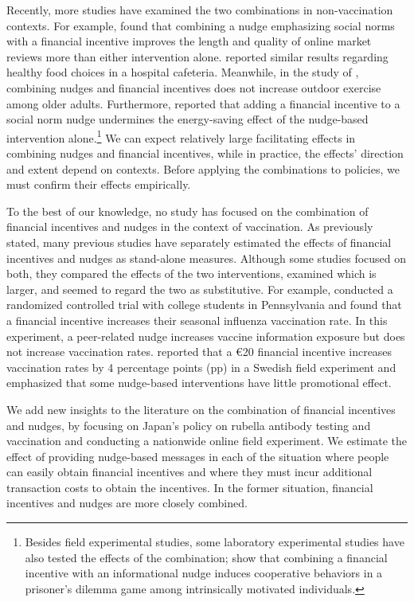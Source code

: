\documentclass[
]{article}
\begin{document}
Recently, more studies have examined the two combinations in non-vaccination contexts. For example, \citet{Burtch2018} found that combining a nudge emphasizing social norms with a financial incentive improves the length and quality of online market reviews more than either intervention alone. \citet{Thorndike2016} reported similar results regarding healthy food choices in a hospital cafeteria. Meanwhile, in the study of \citet{Kullgren2014}, combining nudges and financial incentives does not increase outdoor exercise among older adults. Furthermore, \citet{Pellerano2017} reported that adding a financial incentive to a social norm nudge undermines the energy-saving effect of the nudge-based intervention alone.\footnote{Besides field experimental studies, some laboratory experimental studies have also tested the effects of the combination; \citet{Chen2021} show that combining a financial incentive with an informational nudge induces cooperative behaviors in a prisoner's dilemma game among intrinsically motivated individuals.} We can expect relatively large facilitating effects in combining nudges and financial incentives, while in practice, the effects' direction and extent depend on contexts. Before applying the combinations to policies, we must confirm their effects empirically.

To the best of our knowledge, no study has focused on the combination of financial incentives and nudges in the context of vaccination. As previously stated, many previous studies have separately estimated the effects of financial incentives \citep{Banerjee2010, Barber2022, Barham2009, Brehm2022} and nudges \citep{Dai2021, Chapman2010, Milkman2021, Sasaki2022} as stand-alone measures. Although some studies focused on both, they compared the effects of the two interventions, examined which is larger, and seemed to regard the two as substitutive. For example, \citet{Bronchetti2015} conducted a randomized controlled trial with college students in Pennsylvania and found that a financial incentive increases their seasonal influenza vaccination rate. In this experiment, a peer-related nudge increases vaccine information exposure but does not increase vaccination rates. \citet{Campos-Mercade2021a} reported that a €20 financial incentive increases vaccination rates by 4 percentage points (pp) in a Swedish field experiment and emphasized that some nudge-based interventions have little promotional effect.

We add new insights to the literature on the combination of financial incentives and nudges, by focusing on Japan's policy on rubella antibody testing and vaccination and conducting a nationwide online field experiment. We estimate the effect of providing nudge-based messages in each of the situation where people can easily obtain financial incentives and where they must incur additional transaction costs to obtain the incentives. In the former situation, financial incentives and nudges are more closely combined.
\end{document}
